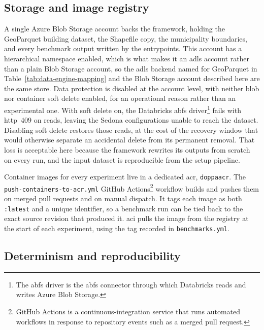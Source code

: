 \subsection{Storage and image registry}
\label{system-architecture-and-implementation:infrastructure:storage-and-image-registry}

A single Azure Blob Storage account backs the framework, holding the GeoParquet building dataset, the Shapefile copy, the municipality boundaries, and every benchmark output written by the entrypoints. This account has a hierarchical namespace enabled, which is what makes it an \acrshort{adls} account rather than a plain Blob Storage account, so the \acrshort{adls} backend named for GeoParquet in Table~\ref{tab:data-engine-mapping} and the Blob Storage account described here are the same store. Data protection is disabled at the account level, with neither blob nor container soft delete enabled, for an operational reason rather than an experimental one. With soft delete on, the Databricks \acrfull{abfs} driver\footnote{The \acrshort{abfs} driver is the \acrlong{abfs} connector through which Databricks reads and writes Azure Blob Storage.} fails with \acrshort{http}~409 on reads, leaving the Sedona configurations unable to reach the dataset. Disabling soft delete restores those reads, at the cost of the recovery window that would otherwise separate an accidental delete from its permanent removal. That loss is acceptable here because the framework rewrites its outputs from scratch on every run, and the input dataset is reproducible from the setup pipeline.

Container images for every experiment live in a dedicated \acrfull{acr}, \texttt{doppaacr}. The \texttt{push-containers-to-acr.yml} GitHub Actions\footnote{GitHub Actions is a continuous-integration service that runs automated workflows in response to repository events such as a merged pull request.} workflow builds and pushes them on merged pull requests and on manual dispatch. It tags each image as both \texttt{:latest} and a unique identifier, so a benchmark run can be tied back to the exact source revision that produced it. \acrshort{aci} pulls the image from the registry at the start of each experiment, using the tag recorded in \texttt{benchmarks.yml}.

\subsection{Determinism and reproducibility}
\label{system-architecture-and-implementation:infrastructure:determinism-and-reproducibility}

